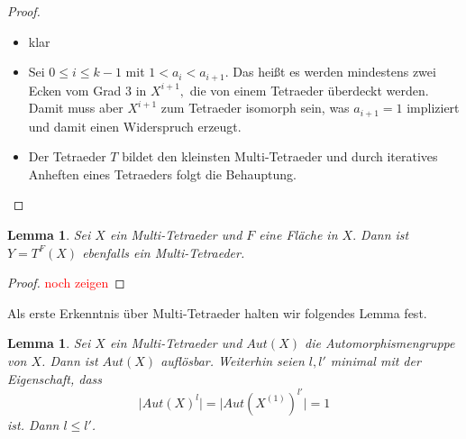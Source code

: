 \documentclass[12pt,titlepage,twoside,cleardoublepage]{article}
\theoremstyle{nummermitklammern}
\newtheorem{lemma}[temp]{Lemma}
\newtheorem{lemma}[zahl]{Lemma}
\numberwithin{equation}{section}
\begin{document}
\begin{proof}
\begin{itemize}
\item klar
\item Sei $0\leq i \leq k-1$ mit $1<a_i <a_{i+1}.$ Das heißt es werden mindestens zwei Ecken vom Grad 3 in $X^{i+1},$ die von einem Tetraeder überdeckt werden. Damit muss aber $X^{i+1}$ zum Tetraeder isomorph sein, was $a_{i+1}=1$ impliziert und damit einen Widerspruch erzeugt.
 \item Der Tetraeder $T$ bildet den kleinsten Multi-Tetraeder  und durch iteratives Anheften eines Tetraeders folgt die Behauptung.
\end{itemize}
\end{proof}
\begin{lemma}
Sei $X$ ein Multi-Tetraeder und $F$ eine Fläche in $X.$ Dann ist $Y=T^F(X)$ ebenfalls ein Multi-Tetraeder.
\end{lemma}
\begin{proof}
\textcolor{red}{noch zeigen}
\end{proof}
Als erste Erkenntnis über Multi-Tetraeder halten wir folgendes Lemma fest.
\begin{lemma}
Sei $X$ ein Multi-Tetraeder und $Aut(X)$ die Automorphismengruppe von $X$. Dann ist $Aut(X)$ auflösbar.
Weiterhin seien $l,l'$ minimal mit der Eigenschaft, dass
\[
\vert Aut(X)^l\vert=\vert Aut(X^{(1)})^{l'}\vert =1
\] ist. Dann $l\leq l'$.
\end{lemma}
\end{document}
